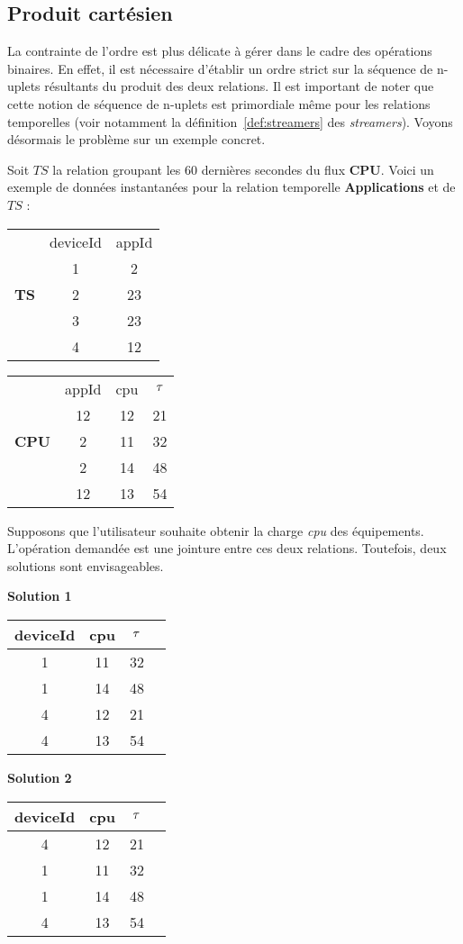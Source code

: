 \subsection{Produit cartésien}
La contrainte de l'ordre est plus délicate à gérer dans le cadre des opérations binaires. En effet, il est nécessaire d'établir un ordre strict sur la séquence de n-uplets résultants du produit des deux relations. Il est important de noter que cette notion de séquence de n-uplets est primordiale même pour les relations temporelles (voir notamment la définition~\ref{def:streamers} des \textit{streamers}). Voyons désormais le problème sur un exemple concret.
\begin{example}\label{ex:asymetrie}
Soit $TS$ la relation groupant les 60 dernières secondes du flux \textbf{CPU}. Voici un exemple de données instantanées pour la relation temporelle \textbf{Applications} et de $TS$ :
\begin{center}
\begin{tabular}{ccc}
& deviceId & appId \\ %
\cline{2-3} & 1 & 2 \\
\textbf{TS} &2 & 23 \\
&3 & 23 \\
&4 & 12 \\
\end{tabular} \quad \quad \quad
\begin{tabular}{cccc}
& appId & cpu & $\tau$ \\%
\cline{2-4} & 12 & 12 & 21 \\
\textbf{CPU}& 2 & 11 & 32 \\
& 2 & 14 & 48 \\
&12& 13 & 54 \\
\end{tabular}
\end{center}

Supposons que l'utilisateur souhaite obtenir la charge \textit{cpu} des équipements. L'opération demandée est une jointure entre ces deux relations. Toutefois, deux solutions sont envisageables.
\begin{center}
\textbf{Solution 1 }
\begin{tabular}{cccc} 
        deviceId & cpu & $\tau$ \\ \hline 
        1&  11&  32  \\
        1&  14&  48  \\
        4&  12&  21 \\
        4&  13&  54\\
\end{tabular}
\quad \quad \quad\textbf{Solution 2 }
\begin{tabular}{cccc}
        deviceId & cpu & $\tau$ \\ \hline 
        4&  12&  21\\
        1&  11&  32\\
        1&  14&  48\\
        4&  13&  54\\
\end{tabular}
\end{center}


\end{example}
